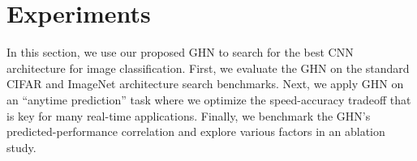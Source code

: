 \section{Experiments}
In this section, we use our proposed GHN to search for the best CNN architecture for image
classification. First, we evaluate the GHN on the standard CIFAR \citep{krizhevsky2009cifar} and
ImageNet \citep{russakovsky2015imagenet} architecture search benchmarks. Next, we apply GHN on an
``anytime prediction'' task where we optimize the speed-accuracy tradeoff that is key for many
real-time applications. Finally, we benchmark the GHN's  predicted-performance correlation and
explore various factors in an ablation study.



